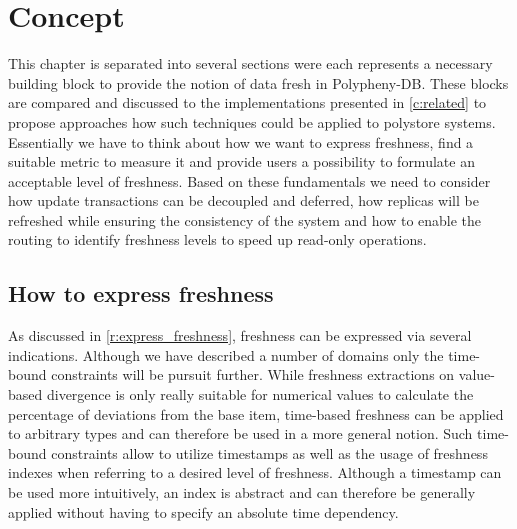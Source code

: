 \chapter{Concept}
\label{c:concept}


This chapter is separated into several sections were each represents a necessary building block to provide the notion of data fresh in Polypheny-DB.
These blocks are compared and discussed to the implementations presented in \ref{c:related} to propose approaches how such techniques could be applied to polystore
systems. Essentially we have to think about how we want to express freshness, find a suitable metric to measure it and provide users a possibility to formulate 
an acceptable level of freshness. Based on these fundamentals we need to consider how update transactions can be decoupled and deferred, how replicas will
be refreshed while ensuring the consistency of the system and how to enable the routing to identify freshness levels to speed up read-only operations. 



\section{How to express freshness}
\label{express}

As discussed in \ref{r:express_freshness}, freshness can be expressed via several indications.
Although we have described a number of domains only the time-bound constraints will be pursuit further. 
While freshness extractions on value-based divergence is only really suitable for numerical values
to calculate the percentage of deviations from the base item, time-based freshness can be applied to arbitrary types and can therefore be used 
in a more general notion. 
Such time-bound constraints allow to utilize timestamps as well as the usage of freshness indexes when referring to a desired level of freshness. 
Although a timestamp can be used more intuitively, an index is abstract and can therefore be generally applied without having to specify an absolute time dependency.

